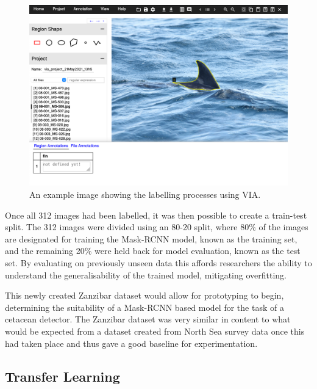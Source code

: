   \begin{figure}
	\begin{center}
		\includegraphics[scale=0.4]{Chapter3/figs/via-json-example-zanzibar-1.png}
	\end{center}
	\caption{An example image showing the labelling processes using VIA.
	}
	\label{fig:via-json-example-zanzibar}
\end{figure}

Once all 312 images had been labelled, it was then possible to create a train-test split. The 312 images were divided using an 80-20 split, where 80\% of the images are designated for training the Mask-RCNN model, known as the training set, and the remaining 20\% were held back for model evaluation, known as the test set. By evaluating on previously unseen data this affords researchers the ability to understand the generalisability of the trained model, mitigating overfitting. 

This newly created Zanzibar dataset would allow for prototyping to begin, determining the suitability of a Mask-RCNN based model for the task of a cetacean detector. The Zanzibar dataset was very similar in content to what would be expected from a dataset created from North Sea survey data once this had taken place and thus gave a good baseline for experimentation. 

\subsection{Transfer Learning}\label{ch:cetDet,sec:initialTesting,sub:transferLearning}

